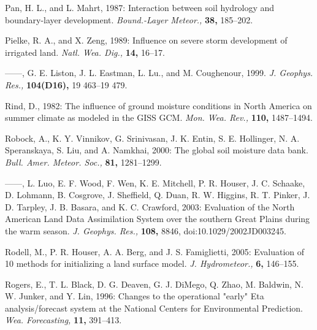 \documentclass[twocolumn]{article}
\begin{document}
\begin{references}
{\item Pan, H. L., and L. Mahrt, 1987: Interaction between soil hydrology and boundary-layer development. \textit{Bound.-Layer Meteor.,} \textbf{38,} 185--202.

\item Pielke, R. A., and X. Zeng, 1989: Influence on severe storm development of irrigated land. \textit{Natl. Wea. Dig.,} \textbf{14,} 16--17.

\item ------, G. E. Liston, J. L. Eastman, L. Lu., and M. Coughenour, 1999. \textit{J. Geophys. Res.,} \textbf{104(D16),} 19 463--19 479.

\item Rind, D., 1982: The influence of ground moisture conditions in North America on summer climate as modeled in the GISS GCM. \textit{Mon. Wea. Rev.,} \textbf{110,} 1487--1494.

\item Robock, A., K. Y. Vinnikov, G. Srinivasan, J. K. Entin, S. E. Hollinger, N. A. Speranskaya, S. Liu, and A. Namkhai, 2000: The global soil moisture data bank. \textit{Bull. Amer. Meteor. Soc.,} \textbf{81,} 1281--1299.

\item ------, L. Luo, E. F. Wood, F. Wen, K. E. Mitchell, P. R. Houser, J. C. Schaake, D. Lohmann, B. Cosgrove, J. Sheffield, Q. Duan, R. W. Higgins, R. T. Pinker, J. D. Tarpley, J. B. Basara, and K. C. Crawford, 2003: Evaluation of the North American Land Data Assimilation System over the southern Great Plains during the warm season. \textit{J. Geophys. Res.,} \textbf{108,} 8846, doi:10.1029/2002JD003245.

\item Rodell, M., P. R. Houser, A. A. Berg, and J. S. Famiglietti, 2005: Evaluation of 10 methods for initializing a land surface model. \textit{J. Hydrometeor.,} \textbf{6,} 146--155.

\item Rogers, E., T. L. Black, D. G. Deaven, G. J. DiMego, Q. Zhao, M. Baldwin, N. W. Junker, and Y. Lin, 1996: Changes to the operational "early" Eta analysis/forecast system at the National Centers for Environmental Prediction. \textit{Wea. Forecasting,} \textbf{11,} 391--413.

\vspace{0.235mm}

}
\end{references}
\end{document}
